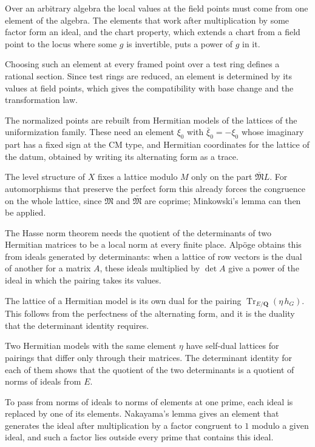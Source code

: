 Over an arbitrary algebra the local values at the field points must come from one element of the algebra. The
elements that work after multiplication by some factor form an ideal, and the chart property, which extends a chart
from a field point to the locus where some $g$ is invertible, puts a power of $g$ in it.

Choosing such an element at every framed point over a test ring defines a rational section. Since test rings are
reduced, an element is determined by its values at field points, which gives the compatibility with base change
and the transformation law.

The normalized points are rebuilt from Hermitian models of the lattices of the uniformization family. These need
an element $\xi_0$ with $\bar\xi_0=-\xi_0$ whose imaginary part has a fixed sign at the CM type, and Hermitian
coordinates for the lattice of the datum, obtained by writing its alternating form as a trace.

The level structure of $X$ fixes a lattice modulo $M$ only on the part $\bar{\mathfrak M}L$. For automorphisms that
preserve the perfect form this already forces the congruence on the whole lattice, since $\mathfrak M$ and
$\bar{\mathfrak M}$ are coprime; Minkowski's lemma can then be applied.

The Hasse norm theorem needs the quotient of the determinants of two Hermitian matrices to be a local norm at every
finite place. Alp\"oge obtains this from ideals generated by determinants: when a lattice of row vectors is the dual of
another for a matrix $A$, these ideals multiplied by $\det A$ give a power of the ideal in which the pairing takes its
values.

The lattice of a Hermitian model is its own dual for the pairing $\operatorname{Tr}_{E/\mathbf Q}(\eta\,h_G)$. This
follows from the perfectness of the alternating form, and it is the duality that the determinant identity requires.

Two Hermitian models with the same element $\eta$ have self-dual lattices for pairings that differ only through their
matrices. The determinant identity for each of them shows that the quotient of the two determinants is a quotient of
norms of ideals from $E$.

To pass from norms of ideals to norms of elements at one prime, each ideal is replaced by one of its elements. Nakayama's
lemma gives an element that generates the ideal after multiplication by a factor congruent to $1$ modulo a given ideal,
and such a factor lies outside every prime that contains this ideal.

